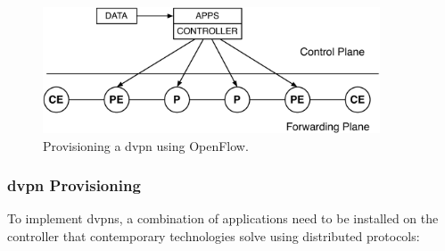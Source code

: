 \begin{figure}[h]
	\centering
	\includegraphics[width=10cm]{./includes/nms-stack-of.pdf}
	\caption{Provisioning a \ac{dvpn} using OpenFlow.}
	\label{fig:nms-stack-of}
\end{figure}

\subsubsection{\acs{dvpn} Provisioning} %
\label{ssub:dvpn_application}

To implement \acp{dvpn}, a combination of applications need to be installed on the controller that contemporary technologies solve using distributed protocols:

